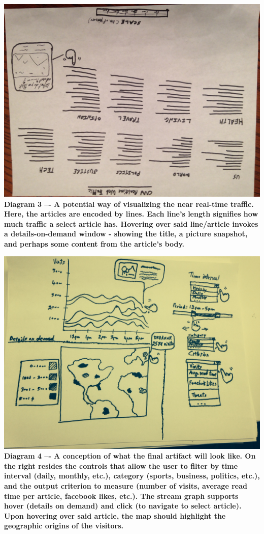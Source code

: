 \documentclass[12pt]{article}
\begin{document}
\noindent\includegraphics[scale=0.2]{img/cnn_categories}
\noindent\textbf{Diagram 3 –- A potential way of visualizing the near real-time traffic. Here, the articles are encoded by lines. Each line’s length signifies how much traffic a select article has. Hovering over said line/article invokes a details-on-demand window - showing the title, a picture snapshot, and perhaps some content from the article’s body.}

\noindent\includegraphics[scale=0.2]{img/overall_viz}
\noindent\textbf{Diagram 4 –- A conception of what the final artifact will look like. On the right resides the controls that allow the user to filter by time interval (daily, monthly, etc.), category (sports, business, politics, etc.), and the output criterion to measure (number of visits, average read time per article, facebook likes, etc.). The stream graph supports hover (details on demand) and click (to navigate to select article). Upon hovering over said article, the map should highlight the geographic origins of the visitors.}
\end{document}
